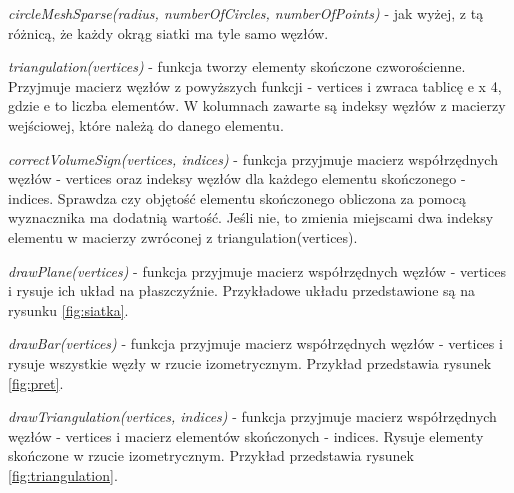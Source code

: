 \textit{circleMeshSparse(radius, numberOfCircles, numberOfPoints)} - jak wyżej, z tą różnicą, że każdy okrąg siatki ma tyle samo węzłów.

\textit{triangulation(vertices)} - funkcja tworzy elementy skończone czworościenne. Przyjmuje macierz węzłów z powyższych funkcji - vertices i zwraca tablicę e x 4, gdzie e to liczba elementów. W kolumnach zawarte są indeksy węzłów z macierzy wejściowej, które należą do danego elementu.

\textit{correctVolumeSign(vertices, indices)} - funkcja przyjmuje macierz współrzędnych węzłów - vertices oraz indeksy węzłów dla każdego elementu skończonego - indices. Sprawdza czy objętość elementu skończonego obliczona za pomocą wyznacznika ma dodatnią wartość. Jeśli nie, to zmienia miejscami dwa indeksy elementu w macierzy zwróconej z triangulation(vertices).

\textit{drawPlane(vertices)} - funkcja przyjmuje macierz współrzędnych węzłów - vertices i rysuje ich układ na płaszczyźnie. Przykładowe układu przedstawione są na rysunku \ref{fig:siatka}.

\textit{drawBar(vertices)} - funkcja przyjmuje macierz współrzędnych węzłów - vertices i rysuje wszystkie węzły w rzucie izometrycznym. Przykład przedstawia rysunek \ref{fig:pret}.

\textit{drawTriangulation(vertices, indices)} - funkcja przyjmuje macierz współrzędnych węzłów - vertices i macierz elementów skończonych - indices. Rysuje elementy skończone w rzucie izometrycznym. Przykład przedstawia rysunek \ref{fig:triangulation}.

